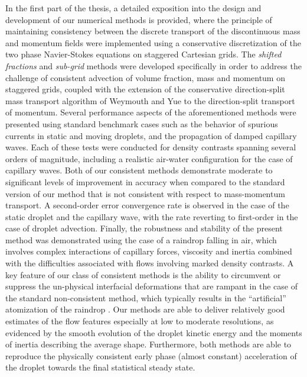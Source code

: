 In the first part of the thesis, a detailed exposition into the design and 
development of our numerical methods is provided, where the principle 
of maintaining consistency between the discrete transport of
the discontinuous mass and momentum fields were implemented  
using a conservative discretization of the two phase 
Navier-Stokes equations on staggered Cartesian grids. 
The \textit{shifted fractions} and \textit{sub-grid} methods were developed
specifically in order to address the challenge of consistent 
advection of volume fraction, mass and momentum on staggered grids,
coupled with the extension of the conservative direction-split mass transport
algorithm of Weymouth and Yue \cite{wy} to the direction-split transport of momentum.
Several performance aspects of the aforementioned methods were presented using 
standard benchmark cases such as the behavior of spurious currents in static and
moving droplets, and the propagation of damped capillary waves. 
Each of these tests were conducted for density contrasts spanning several orders of magnitude, 
including a realistic air-water configuration for the case of capillary waves. 
Both of our consistent methods demonstrate moderate to significant levels of improvement 
in accuracy when compared to the standard version of our method that is not 
consistent with respect to mass-momentum transport. 
A second-order error convergence rate is observed in the case of the 
static droplet and the capillary wave, with the rate
reverting to first-order in the case of droplet advection.
Finally, the robustness and stability of the present method was demonstrated
using the case of a raindrop falling in air, which involves complex interactions
of capillary forces, viscosity and inertia combined with the difficulties associated
with flows involving marked density contrasts.  
A key feature of our class of consistent methods is the ability to circumvent 
or suppress the un-physical interfacial deformations that are rampant 
in the case of the standard non-consistent method, which typically results in the 
``artificial'' atomization of the raindrop .
Our methods are able to deliver relatively good estimates of the flow features 
especially at low to moderate resolutions, as evidenced by the smooth evolution 
of the droplet kinetic energy and the moments of inertia describing the average shape. 
Furthermore, both methods are able to reproduce the physically consistent early phase 
(almost constant) acceleration of the droplet towards the final statistical steady state.  


